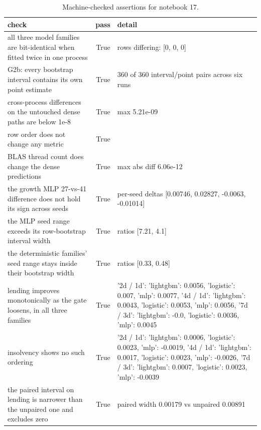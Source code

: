 \begin{table}
\caption{Machine-checked assertions for notebook 17.}
\label{tab:17_checks}
\begin{tabular}{lrl}
\toprule
check & pass & detail \\
\midrule
all three model families are bit-identical when fitted twice in one process & True & rows differing: [0, 0, 0] \\
G2b: every bootstrap interval contains its own point estimate & True & 360 of 360 interval/point pairs across six runs \\
cross-process differences on the untouched dense paths are below 1e-8 & True & max 5.21e-09 \\
row order does not change any metric & True &  \\
BLAS thread count does change the dense predictions & True & max abs diff 6.06e-12 \\
the growth MLP 27-vs-41 difference does not hold its sign across seeds & True & per-seed deltas [0.00746, 0.02827, -0.0063, -0.01014] \\
the MLP seed range exceeds its row-bootstrap interval width & True & ratios [7.21, 4.1] \\
the deterministic families' seed range stays inside their bootstrap width & True & ratios [0.33, 0.48] \\
lending improves monotonically as the gate loosens, in all three families & True & {'2d / 1d': {'lightgbm': 0.0056, 'logistic': 0.007, 'mlp': 0.0077}, '4d / 1d': {'lightgbm': 0.0043, 'logistic': 0.0053, 'mlp': 0.0056}, '7d / 3d': {'lightgbm': -0.0, 'logistic': 0.0036, 'mlp': 0.0045}} \\
insolvency shows no such ordering & True & {'2d / 1d': {'lightgbm': 0.0006, 'logistic': 0.0023, 'mlp': -0.0019}, '4d / 1d': {'lightgbm': 0.0017, 'logistic': 0.0023, 'mlp': -0.0026}, '7d / 3d': {'lightgbm': 0.0007, 'logistic': 0.0023, 'mlp': -0.0039}} \\
the paired interval on lending is narrower than the unpaired one and excludes zero & True & paired width 0.00179 vs unpaired 0.00891 \\
\bottomrule
\end{tabular}
\end{table}
